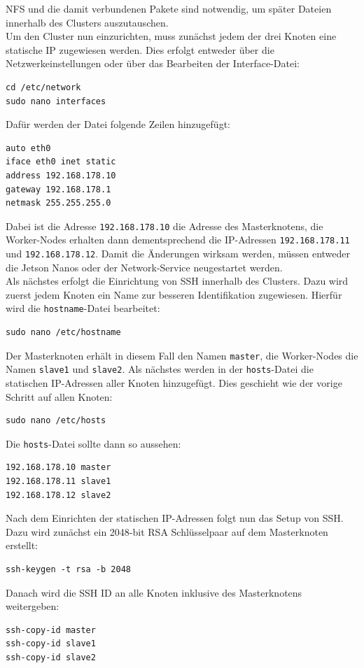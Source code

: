 \documentclass[doktyp=semarbeit, sprache=german]{TUBAFarbeiten}
\begin{document}
NFS und die damit verbundenen Pakete sind notwendig, um später Dateien innerhalb des Clusters auszutauschen.
\\Um den Cluster nun einzurichten, muss zunächst jedem der drei Knoten eine statische IP zugewiesen werden. Dies erfolgt entweder über die Netzwerkeinstellungen oder über das Bearbeiten der Interface-Datei:
\begin{lstlisting}
cd /etc/network
sudo nano interfaces
\end{lstlisting}
Dafür werden der Datei folgende Zeilen hinzugefügt:
\begin{lstlisting}
auto eth0
iface eth0 inet static
address 192.168.178.10
gateway 192.168.178.1
netmask 255.255.255.0
\end{lstlisting}
Dabei ist die Adresse \texttt{192.168.178.10} die Adresse des Masterknotens, die Worker-Nodes erhalten dann dementsprechend die IP-Adressen \texttt{192.168.178.11} und \texttt{192.168.178.12}. Damit die Änderungen wirksam werden, müssen entweder die Jetson Nanos oder der Network-Service neugestartet werden.
\\Als nächstes erfolgt die Einrichtung von SSH innerhalb des Clusters. Dazu wird zuerst jedem Knoten ein Name zur besseren Identifikation zugewiesen. Hierfür wird die \texttt{hostname}-Datei bearbeitet:
\begin{lstlisting}
sudo nano /etc/hostname
\end{lstlisting}
Der Masterknoten erhält in diesem Fall den Namen \texttt{master}, die Worker-Nodes die Namen \texttt{slave1} und \texttt{slave2}. Als nächstes werden in der \texttt{hosts}-Datei die statischen IP-Adressen aller Knoten hinzugefügt. Dies geschieht wie der vorige Schritt auf allen Knoten:
\begin{lstlisting}
sudo nano /etc/hosts
\end{lstlisting}
Die \texttt{hosts}-Datei sollte dann so aussehen:
\begin{lstlisting}
192.168.178.10 master
192.168.178.11 slave1
192.168.178.12 slave2
\end{lstlisting}
Nach dem Einrichten der statischen IP-Adressen folgt nun das Setup von SSH. Dazu wird zunächst ein 2048-bit RSA Schlüsselpaar auf dem Masterknoten erstellt:
\begin{lstlisting}
ssh-keygen -t rsa -b 2048
\end{lstlisting}
Danach wird die SSH ID an alle Knoten inklusive des Masterknotens weitergeben:
\begin{lstlisting}
ssh-copy-id master
ssh-copy-id slave1
ssh-copy-id slave2
\end{lstlisting}
\end{document}
